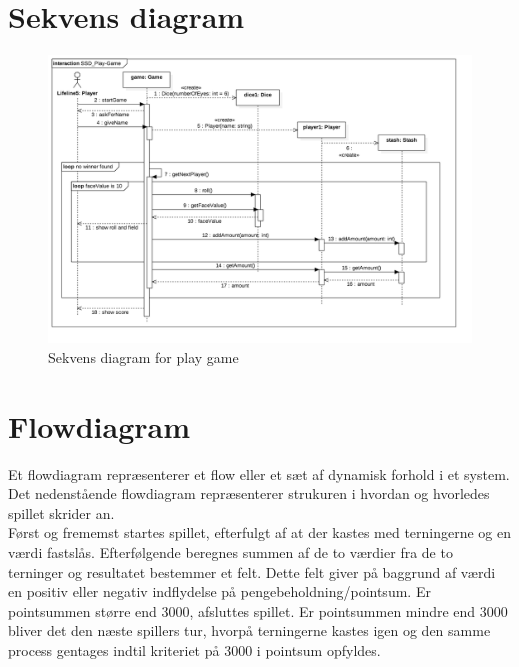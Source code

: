 \section{Sekvens diagram}

\begin{figure}[H]
    \begin{center}
        \includegraphics[width=15cm]{graphics/SSD_Play-Game.png}
        \caption{Sekvens diagram for play game}
        \label{fig:sequence_diagram}
    \end{center}
\end{figure}


\section{Flowdiagram}

\noindent Et flowdiagram repræsenterer et flow eller et sæt af dynamisk forhold i et system.
Det nedenstående flowdiagram repræsenterer strukuren i hvordan og hvorledes spillet skrider an.\\

\noindent Først og frememst startes spillet, efterfulgt af at der kastes med terningerne og en værdi fastslås.
Efterfølgende beregnes summen af de to værdier fra de to terninger og resultatet bestemmer et felt.
Dette felt giver på baggrund af værdi en positiv eller negativ indflydelse på pengebeholdning/pointsum.
Er pointsummen større end 3000, afsluttes spillet.
Er pointsummen mindre end 3000 bliver det den næste spillers tur, hvorpå terningerne kastes igen og den samme process gentages indtil kriteriet på 3000 i pointsum opfyldes.\\

